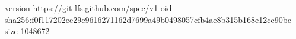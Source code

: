 version https://git-lfs.github.com/spec/v1
oid sha256:f0f117202ee29c9616271162d7699a49b0498057cfb4ae8b315b168e12ce90bc
size 1048672
